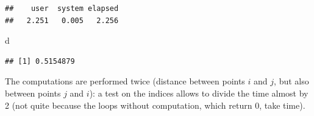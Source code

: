 \documentclass[
  12pt,
  american,
  a4paper,
  extrafontsizes,onecolumn,openright
  ]{memoir}
\newenvironment{Shaded}{\begin{snugshade}}{\end{snugshade}}
\newcommand{\AttributeTok}[1]{\textcolor[rgb]{0.13,0.29,0.53}{#1}}
\newcommand{\ControlFlowTok}[1]{\textcolor[rgb]{0.13,0.29,0.53}{\textbf{#1}}}
\newcommand{\DecValTok}[1]{\textcolor[rgb]{0.00,0.00,0.81}{#1}}
\newcommand{\FunctionTok}[1]{\textcolor[rgb]{0.13,0.29,0.53}{\textbf{#1}}}
\newcommand{\NormalTok}[1]{#1}
\newcommand{\OtherTok}[1]{\textcolor[rgb]{0.56,0.35,0.01}{#1}}
\newcommand{\SpecialCharTok}[1]{\textcolor[rgb]{0.81,0.36,0.00}{\textbf{#1}}}
\newlength{\rf}
\begin{document}
\begin{verbatim}
##    user  system elapsed 
##   2.251   0.005   2.256
\end{verbatim}

\begin{Shaded}
\begin{Highlighting}[]
\NormalTok{d}
\end{Highlighting}
\end{Shaded}

\begin{verbatim}
## [1] 0.5154879
\end{verbatim}

\normalsize

The computations are performed twice (distance between points \(i\) and \(j\), but also between points \(j\) and \(i\)): a test on the indices allows to divide the time almost by 2 (not quite because the loops without computation, which return \(0\), take time).

\scriptsize

\begin{Shaded}
\end{Shaded}
\end{document}
